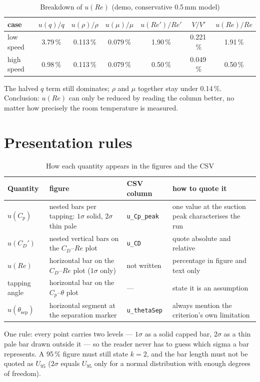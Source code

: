 \documentclass[11pt,a4paper]{article}
\newcommand{\Cp}{\ensuremath{C_p}}
\newcommand{\CD}{\ensuremath{C_D}}
\newcommand{\ReD}{\ensuremath{\mathit{Re}}}
\begin{document}
\begin{table}[H]
\centering
\caption{Breakdown of $u(\ReD)$ (demo, conservative 0.5\,mm model)}
\small
\begin{tabular}{@{}l c c c c c c@{}}
\toprule
case & $u(q)/q$ & $u(\rho)/\rho$ & $u(\mu)/\mu$ & $u(\ReD')/\ReD'$ & $V/V'$ & $u(\ReD)/\ReD$ \\
\midrule
low speed & 3.79\,\% & 0.113\,\% & 0.079\,\% & 1.90\,\% & 0.221\,\% & 1.91\,\% \\
high speed & 0.98\,\% & 0.113\,\% & 0.079\,\% & 0.50\,\% & 0.049\,\% & 0.50\,\% \\
\bottomrule
\end{tabular}
\end{table}

The halved $q$ term still dominates; $\rho$ and $\mu$ together stay under 0.14\,\%. Conclusion:
$u(\ReD)$ can only be reduced by reading the column better, no matter how precisely the room
temperature is measured.

\section{Presentation rules}

\begin{table}[H]
\centering
\caption{How each quantity appears in the figures and the CSV}
\small
\begin{tabularx}{\textwidth}{@{}l X l X@{}}
\toprule
Quantity & figure & CSV column & how to quote it \\
\midrule
$u(\Cp)$ & nested bars per tapping: $1\sigma$ solid, $2\sigma$ thin pale & \texttt{u\_Cp\_peak} &
one value at the suction peak characterises the run \\
$u(\CD')$ & nested vertical bars on the \CD--\ReD{} plot & \texttt{u\_CD} & quote absolute and relative \\
$u(\ReD)$ & horizontal bar on the \CD--\ReD{} plot ($1\sigma$ only) & not written & percentage in figure and text only \\
tapping angle & horizontal bar on the \Cp--$\theta$ plot & --- & state it is an assumption \\
$u(\theta_{\text{sep}})$ & horizontal segment at the separation marker & \texttt{u\_thetaSep} &
always mention the criterion's own limitation \\
\bottomrule
\end{tabularx}
\end{table}

One rule: every point carries two levels --- $1\sigma$ as a solid capped bar, $2\sigma$ as a thin pale
bar drawn outside it --- so the reader never has to guess which sigma a bar represents. A 95\,\%
figure must still state $k=2$, and the bar length must not be quoted as $U_{95}$ ($2\sigma$ equals
$U_{95}$ only for a normal distribution with enough degrees of freedom).
\end{document}
